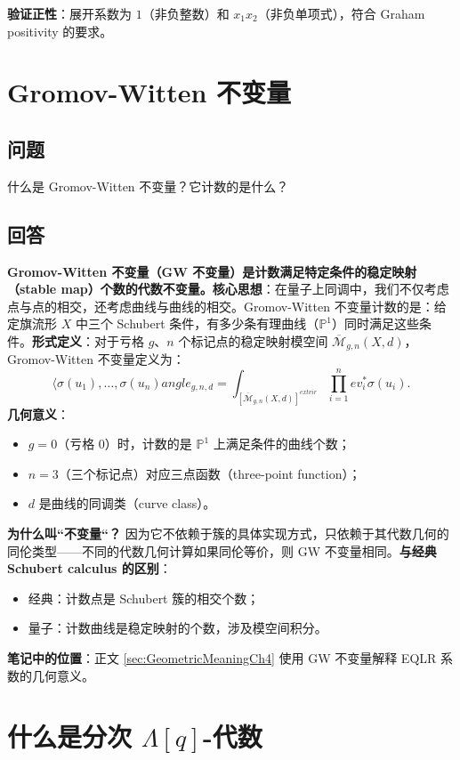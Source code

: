\textbf{验证正性}：展开系数为 $1$（非负整数）和 $x_1 x_2$（非负单项式），符合 Graham positivity 的要求。
\section{Gromov-Witten 不变量}\label{sec:GW-invariant}
\subsection{问题}
什么是 Gromov-Witten 不变量？它计数的是什么？
\subsection{回答}
\textbf{Gromov-Witten 不变量（GW 不变量）是计数满足特定条件的稳定映射（stable map）个数的代数不变量。}\textbf{核心思想}：在量子上同调中，我们不仅考虑点与点的相交，还考虑曲线与曲线的相交。Gromov-Witten 不变量计数的是：给定旗流形 $X$ 中三个 Schubert 条件，有多少条有理曲线（$\mathbb{P}^1$）同时满足这些条件。\textbf{形式定义}：对于亏格 $g$、$n$ 个标记点的稳定映射模空间 $\overline{\mathcal{M}}_{g,n}(X,d)$，Gromov-Witten 不变量定义为：$$\langle \sigma(u_1), \ldots, \sigma(u_n) angle_{g,n,d} = \int_{[\overline{\mathcal{M}}_{g,n}(X,d)]^{ext{vir}}} \prod_{i=1}^n ev_i^* \sigma(u_i).$$\textbf{几何意义}：
\begin{itemize}
\item $g=0$（亏格 0）时，计数的是 $\mathbb{P}^1$ 上满足条件的曲线个数；\item $n=3$（三个标记点）对应三点函数（three-point function）；\item $d$ 是曲线的同调类（curve class）。
\end{itemize}

\textbf{为什么叫``不变量``？} 因为它不依赖于簇的具体实现方式，只依赖于其代数几何的同伦类型——不同的代数几何计算如果同伦等价，则 GW 不变量相同。\textbf{与经典 Schubert calculus 的区别}：
\begin{itemize}
\item 经典：计数点是 Schubert 簇的相交个数；\item 量子：计数曲线是稳定映射的个数，涉及模空间积分。
\end{itemize}

\textbf{笔记中的位置}：正文 \cref{sec:GeometricMeaningCh4} 使用 GW 不变量解释 EQLR 系数的几何意义。

\section{什么是分次 $\Lambda[q]$-代数}\label{sec:graded-Lambda-q-algebra}
